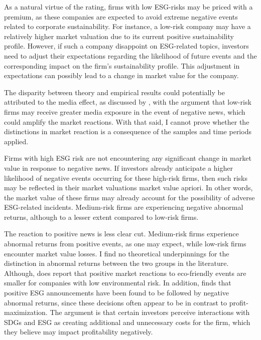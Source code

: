 As a natural virtue of the rating, firms with low ESG-risks may be priced with a premium, as these companies are expected to avoid extreme negative events related to corporate sustainability. For instance, a low-risk company may have a relatively higher market valuation due to its current positive sustainability profile. However, if such a company disappoint on ESG-related topics, investors need to adjust their expectations regarding the likelihood of future events and the corresponding impact on the firm's sustainability profile. This adjustment in expectations can possibly lead to a change in market value for the company. 

The disparity between theory and empirical results could potentially be attributed to the media effect, as discussed by \cite{noNewsgoodnews}, with the argument that low-risk firms may receive greater media exposure in the event of negative news, which could amplify the market reactions. With that said, I cannot prove whether the distinctions in market reaction is a consequence of the samples and time periods applied. 

Firms with high ESG risk are not encountering any significant change in market value in response to negative news. If investors already anticipate a higher likelihood of negative events occurring for these high-risk firms, then such risks may be reflected in their market valuations market value apriori. In other words, the market value of these firms may already account for the possibility of adverse ESG-related incidents. Medium-risk firms are experiencing negative abnormal returns, although to a lesser extent compared to low-risk firms. 

The reaction to positive news is less clear cut. Medium-risk firms experience abnormal returns from positive events, as one may expect, while low-risk firms encounter market value losses. I find no theoretical underpinnings for the distinction in abnormal returns between the two groups in the literature. Although, \cite{flammer2013corporate} does report that positive market reactions to eco-friendly events are smaller for companies with low environmental risk. In addition, \cite{fisher2011voluntary} finds that positive ESG announcements have been found to be followed by negative abnormal returns, since these decisions often appear to be in contrast to profit-maximization. The argument is that certain investors perceive interactions with SDGs and ESG as creating additional and unnecessary costs for the firm, which they believe may impact profitability negatively. 

